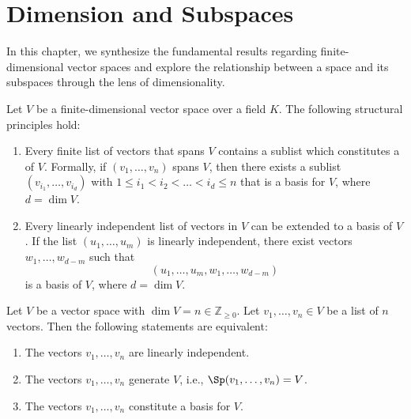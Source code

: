 \setcounter{chapter}{11} %
\renewcommand{\thetheorem}{\thechapter.\arabic{theorem}}
\setcounter{theorem}{0}

\chapter{Dimension and Subspaces}
In this chapter, we synthesize the fundamental results regarding finite-di\-men\-sional vector spaces and explore the relationship between a space and its subspaces through the lens of dimensionality.

\begin{summary}
Let $V$ be a finite-di\-men\-sional vector space over a field $K$. The following structural principles hold:
\begin{enumerate}
    \item Every finite list of vectors that spans $V$ contains a sublist which constitutes a  of $V$. Formally, if $(v_1, \dots, v_n)$ spans $V$, then there exists a sublist $(v_{i_1}, \dots, v_{i_d})$ with $1 \le i_1 < i_2 < \dots < i_d \le n$ that is a basis for $V$, where $d = \dim V$.
    \item Every linearly independent list of vectors in $V$ can be extended to a basis of $V$. If the list $(u_1, \dots, u_m)$ is linearly independent, there exist vectors $w_1, \dots, w_{d-m}$ such that 
    \[(u_1, \dots, u_m, w_1, \dots, w_{d-m})\] 
    is a basis of $V$, where $d = \dim V$.
\end{enumerate}
\end{summary}

\begin{theorem}
\label{thm:basis_equivalent_characterizations}
Let $V$ be a vector space with $\dim V = n \in \mathbb{Z}_{\ge 0}$. Let $v_1, \dots, v_n \in V$ be a list of $n$ vectors. Then the following statements are equivalent:
\begin{enumerate}
    \item[\textbf{(a)}] The vectors $v_1, \dots, v_n$ are linearly independent.
    \item[\textbf{(b)}] The vectors $v_1, \dots, v_n$ generate $V$, i.e., $\Sp(v_1, \dots, v_n) = V$.
    \item[\textbf{(c)}] The vectors $v_1, \dots, v_n$ constitute a basis for $V$.
\end{enumerate}
\end{theorem}

